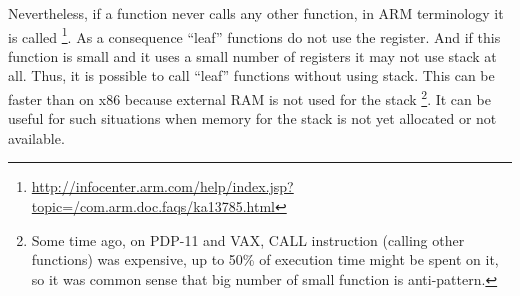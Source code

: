 {Nevertheless, if a function never calls any other function, in ARM terminology it is called}
\footnote{\url{http://infocenter.arm.com/help/index.jsp?topic=/com.arm.doc.faqs/ka13785.html}}. 
{As a consequence ``leaf'' functions do not use the \LR register}.
{And if this function is small and it uses a small number of registers it may not use stack at all}.
{Thus, it is possible to call ``leaf'' functions without using stack}.
{This can be faster than on x86 because external RAM is not used for the stack}
\footnote{
{Some time ago, on PDP-11 and VAX, CALL instruction (calling other functions) was expensive, up to 50\%
of execution time might be spent on it, so it was common sense that big number of small function is anti-pattern}\cite[Chapter 4, Part II]{Raymond:2003:AUP:829549}.}.
{It can be useful for such situations when memory for the stack is not yet allocated or not available}.
